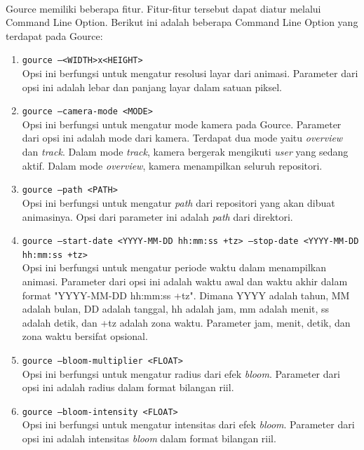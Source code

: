 \ \\
Gource memiliki beberapa fitur. Fitur-fitur tersebut dapat diatur melalui Command Line Option. Berikut ini adalah beberapa Command Line Option yang terdapat pada Gource:
\begin{enumerate}
\item \texttt{gource --<WIDTH>x<HEIGHT>}\\
Opsi ini berfungsi untuk mengatur resolusi layar dari animasi. Parameter dari opsi ini adalah lebar dan panjang layar dalam satuan piksel. 

\item \texttt{gource --camera-mode <MODE>}\\
Opsi ini berfungsi untuk mengatur mode kamera pada Gource. Parameter dari opsi ini adalah mode dari kamera. Terdapat dua mode yaitu \textit{overview} dan \textit{track}. Dalam mode \textit{track}, kamera bergerak mengikuti \textit{user} yang sedang aktif. Dalam mode \textit{overview}, kamera menampilkan seluruh repositori.

\item \texttt{gource --path <PATH>}\\
Opsi ini berfungsi untuk mengatur \textit{path} dari repositori yang akan dibuat animasinya. Opsi dari parameter ini adalah \textit{path} dari direktori.

\item \texttt{gource --start-date <YYYY-MM-DD hh:mm:ss +tz> --stop-date <YYYY-MM-DD hh:mm:ss +tz>}\\
Opsi ini berfungsi untuk mengatur periode waktu dalam menampilkan animasi. Parameter dari opsi ini adalah waktu awal dan waktu akhir dalam format "YYYY-MM-DD hh:mm:ss +tz". Dimana YYYY adalah tahun, MM adalah bulan, DD adalah tanggal, hh adalah jam, mm adalah menit, ss adalah detik, dan +tz adalah zona waktu. Parameter jam, menit, detik, dan zona waktu bersifat opsional.    

\item \texttt{gource --bloom-multiplier <FLOAT> }\\
Opsi ini berfungsi untuk mengatur radius dari efek \textit{bloom}. Parameter dari opsi ini adalah radius dalam format bilangan riil.

\item \texttt{gource --bloom-intensity <FLOAT>}\\
Opsi ini berfungsi untuk mengatur intensitas dari efek \textit{bloom}. Parameter dari opsi ini adalah intensitas \textit{bloom} dalam format bilangan riil.


\end{enumerate}
